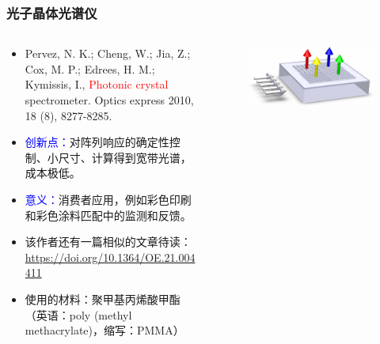 \begin{frame}[c]
    \frametitle{光子晶体光谱仪}
    \begin{columns}
        \begin{column}{.7\textwidth}
            \begin{itemize}
                \item Pervez, N. K.;  Cheng, W.;  Jia, Z.;  Cox, M. P.;  Edrees, H. M.; Kymissis, I., \textcolor{red}{Photonic crystal} spectrometer. Optics express 2010, 18 (8), 8277-8285.
                \item \textcolor{blue}{创新点：}对阵列响应的确定性控制、小尺寸、计算得到宽带光谱，成本极低。
                \item \textcolor{blue}{意义：}消费者应用，例如彩色印刷和彩色涂料匹配中的监测和反馈。
                \item \footnotesize{该作者还有一篇相似的文章待读：\url{https://doi.org/10.1364/OE.21.004411}}
                \item 使用的材料：聚甲基丙烯酸甲酯（英语：poly (methyl methacrylate)，缩写：PMMA）
            \end{itemize}
        \end{column}
        \begin{column}{.3\textwidth}
            \begin{figure}[H] %
                \centering %
                \includegraphics[width=1.\textwidth]{figures/Photonic crystal spectrometer_1.png} %
            \end{figure}
            \begin{figure}[H] %
                \centering %

\end{figure}
\end{column}
\end{columns}
\end{frame}
